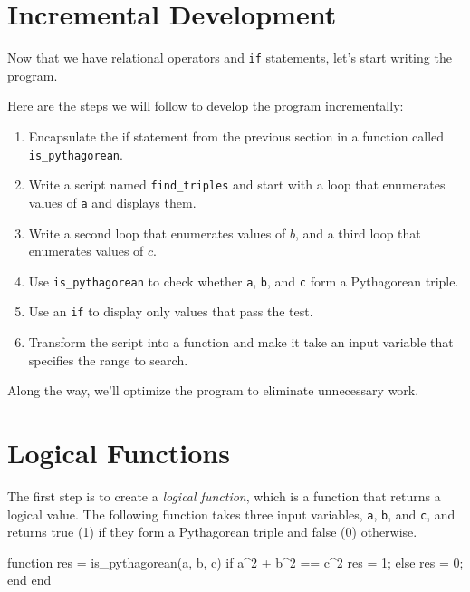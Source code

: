 \section{Incremental Development}
\label{increxample}

Now that we have relational operators and {\tt if} statements, let's start writing
the program.

Here are the steps we will follow to develop the program incrementally:

\begin{enumerate}

\item Encapsulate the if statement from the previous section in a function called \verb"is_pythagorean".

\item Write a script named \verb"find_triples" and start with a loop that enumerates values of {\tt a} and displays them.

\item Write a second loop that enumerates values of $b$, and a third loop that enumerates values of $c$.

\item Use \verb"is_pythagorean" to check whether {\tt a}, {\tt b}, and {\tt c} form a Pythagorean triple.

\item Use an {\tt if} to display only values that pass the test.

\item Transform the script into a function and make it take an input variable that specifies the range to search.

\end{enumerate}

Along the way, we'll optimize the program to eliminate unnecessary work.


\section{Logical Functions}

The first step is to create a {\em logical function}, which is a function that returns a logical value.
The following function takes three input variables, {\tt a}, {\tt b}, and {\tt c}, and returns true (1) if they form a Pythagorean triple and false (0) otherwise.

\begin{code}
function res = is_pythagorean(a, b, c)
    if a^2 + b^2 == c^2
        res = 1;
    else
        res = 0;
    end
end
\end{code}

